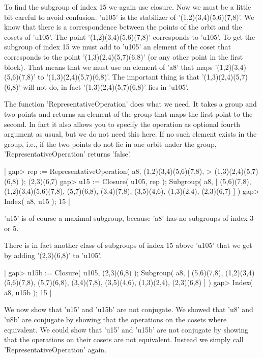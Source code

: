 To find the subgroup of index 15 we  again use closure.  Now we must be a
little bit  careful   to avoid  confusion.   'u105' is  the stabilizer of
'(1,2)(3,4)(5,6)(7,8)'.  We  know that there is a correspondence  between
the  points  of  the  orbit   and  the  cosets  of   'u105'.   The  point
'(1,2)(3,4)(5,6)(7,8)' corresponds  to 'u105'.   To  get  the subgroup of
index 15  we must add to 'u105' an element of the coset  that corresponds
to the point '(1,3)(2,4)(5,7)(6,8)'  (or any  other  point in  the  first
block).   That  means that  we must  use  an  element of 'a8'  that  maps
'(1,2)(3,4)(5,6)(7,8)' to '(1,3)(2,4)(5,7)(6,8)'.  The important thing is
that  '(1,3)(2,4)(5,7)(6,8)' will not do, in fact  '(1,3)(2,4)(5,7)(6,8)'
lies in 'u105'.

The  function  'RepresentativeOperation'  does what we need.  It  takes a
group and  two points and returns an  element  of the group that maps the
first point  to  the  second.  In fact it also allows  you to specify the
operation  as optional fourth argument as usual, but we do  not need this
here.  If no such element exists in the group, i.e., if the two points do
not lie in one orbit  under the group,  'RepresentativeOperation' returns
'false'.

|    gap> rep := RepresentativeOperation( a8, (1,2)(3,4)(5,6)(7,8),
    >                                         (1,3)(2,4)(5,7)(6,8) );
    (2,3)(6,7)
    gap> u15 := Closure( u105, rep );
    Subgroup( a8, [ (5,6)(7,8), (1,2)(3,4)(5,6)(7,8), (5,7)(6,8),
      (3,4)(7,8), (3,5)(4,6), (1,3)(2,4), (2,3)(6,7) ] )
    gap> Index( a8, u15 );
    15 |

'u15' is of course a maximal subgroup, because 'a8'  has  no subgroups of
index 3 or 5.

There is in fact another class of subgroups of index 15 above 'u105' that
we get by adding '(2,3)(6,8)' to 'u105'.

|    gap> u15b := Closure( u105, (2,3)(6,8) );
    Subgroup( a8, [ (5,6)(7,8), (1,2)(3,4)(5,6)(7,8), (5,7)(6,8),
      (3,4)(7,8), (3,5)(4,6), (1,3)(2,4), (2,3)(6,8) ] )
    gap> Index( a8, u15b );
    15 |

We now show that 'u15' and 'u15b' are not conjugate.  We showed that 'u8'
and  'u8b'  are conjugate by  showing that  the operations on  the cosets
where equivalent.  We could show that 'u15' and 'u15b' are not  conjugate
by showing  that  the  operations  on their  cosets  are not  equivalent.
Instead we simply call 'RepresentativeOperation' again.

